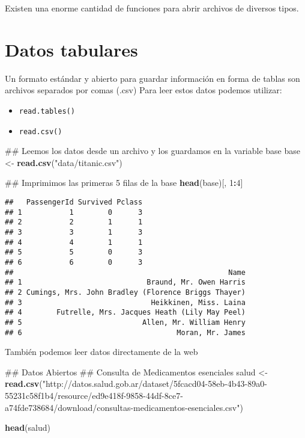 \documentclass[spanish,]{book}
\newenvironment{Shaded}{\begin{snugshade}}{\end{snugshade}}
\newcommand{\KeywordTok}[1]{\textcolor[rgb]{0.13,0.29,0.53}{\textbf{#1}}}
\newcommand{\DecValTok}[1]{\textcolor[rgb]{0.00,0.00,0.81}{#1}}
\newcommand{\StringTok}[1]{\textcolor[rgb]{0.31,0.60,0.02}{#1}}
\newcommand{\OperatorTok}[1]{\textcolor[rgb]{0.81,0.36,0.00}{\textbf{#1}}}
\newcommand{\NormalTok}[1]{#1}
\providecommand{\tightlist}{%
  \setlength{\itemsep}{0pt}\setlength{\parskip}{0pt}}
\begin{document}
Existen una enorme cantidad de funciones para abrir archivos de diversos
tipos.

\section{Datos tabulares}\label{datos-tabulares}

Un formato estándar y abierto para guardar información en forma de
tablas son archivos separados por comas (.csv) Para leer estos datos
podemos utilizar:

\begin{itemize}
\tightlist
\item
  \texttt{read.tables()}
\item
  \texttt{read.csv()}
\end{itemize}

\begin{Shaded}
\begin{Highlighting}[]
\NormalTok{## Leemos los datos desde un archivo y los guardamos en la variable base}
\NormalTok{base <-}\StringTok{ }\KeywordTok{read.csv}\NormalTok{(}\StringTok{"data/titanic.csv"}\NormalTok{)}

\NormalTok{## Imprimimos las primeras 5 filas de la base}
\KeywordTok{head}\NormalTok{(base)[, }\DecValTok{1}\OperatorTok{:}\DecValTok{4}\NormalTok{]}
\end{Highlighting}
\end{Shaded}

\begin{verbatim}
##   PassengerId Survived Pclass
## 1           1        0      3
## 2           2        1      1
## 3           3        1      3
## 4           4        1      1
## 5           5        0      3
## 6           6        0      3
##                                                  Name
## 1                             Braund, Mr. Owen Harris
## 2 Cumings, Mrs. John Bradley (Florence Briggs Thayer)
## 3                              Heikkinen, Miss. Laina
## 4        Futrelle, Mrs. Jacques Heath (Lily May Peel)
## 5                            Allen, Mr. William Henry
## 6                                    Moran, Mr. James
\end{verbatim}

También podemos leer datos directamente de la web

\begin{Shaded}
\begin{Highlighting}[]
\NormalTok{## Datos Abiertos}
\NormalTok{## Consulta de Medicamentos esenciales}
\NormalTok{salud <-}\StringTok{ }\KeywordTok{read.csv}\NormalTok{(}\StringTok{"http://datos.salud.gob.ar/dataset/5fcacd04-58eb-4b43-89a0-55231c58f1b4/resource/ed9e418f-9858-44df-8ce7-a74fde738684/download/consultas-medicamentos-esenciales.csv"}\NormalTok{)}

\KeywordTok{head}\NormalTok{(salud)}
\end{Highlighting}
\end{Shaded}
\end{document}
